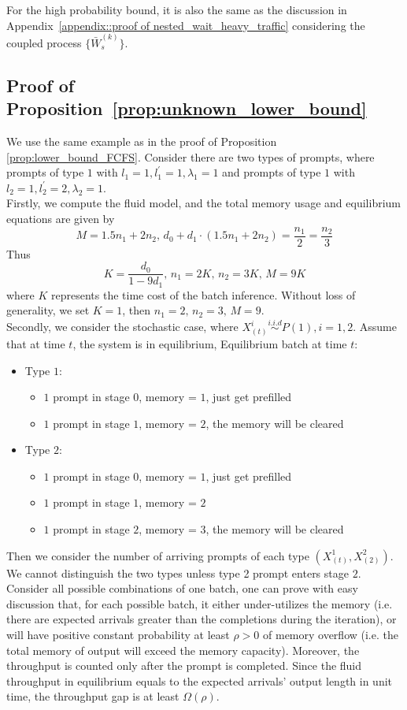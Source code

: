 For the high probability bound, it is also the same as the discussion in Appendix~\ref{appendix::proof of nested_wait_heavy_traffic} considering the coupled process $\{ \bar{W}^{(k)}_s \}$. 


\subsection{Proof of Proposition~\ref{prop:unknown_lower_bound}}\label{sec:proof_unknown_lower_bound}
We use the same example as in the proof of Proposition \ref{prop:lower_bound_FCFS}. Consider there are two types of prompts, where prompts of type $1$ with $l_1=1, l_1^\prime=1, \lambda_1=1$ and prompts of type $1$ with $l_2=1, l_2^\prime=2, \lambda_2=1$. \\
Firstly, we compute the fluid model, and the total memory usage and equilibrium equations are given by
$$M = 1.5n_1+2n_2,\, d_0+d_1\cdot (1.5n_1+2n_2) = \frac{n_1}{2}=\frac{n_2}{3}$$
Thus
$$K = \frac{d_0}{1-9d_1},\, n_1 = 2K,\, n_2=3K,\, M=9K$$
where $K$ represents the time cost of the batch inference. Without loss of generality, we set $K=1$, then $n_1=2, \,n_2=3,\,M=9 $. \\
Secondly, we consider the stochastic case, where $X^i_{(t)}\overset{i.i.d}{\sim} P(1), i=1,2$. Assume that at time $t$, the system is in equilibrium, Equilibrium batch at time $t$:
\begin{itemize}
    \item Type $1$:
    \begin{itemize}
        \itemsep0em
        \item $1$ prompt in stage $0$, memory = $1$, just get prefilled
        \item $1$ prompt in stage $1$, memory = $2$, the memory will be cleared
    \end{itemize}
    \item Type $2$:
    \begin{itemize}
        \itemsep0em
        \item $1$ prompt in stage $0$, memory = $1$, just get prefilled
        \item $1$ prompt in stage $1$, memory = $2$
        \item $1$ prompt in stage $2$, memory = $3$, the memory will be cleared
    \end{itemize}
\end{itemize}
Then we consider the number of arriving prompts of each type $(X^1_{(t)}, X^2_{(2)})$. We cannot distinguish the two types unless type 2 prompt enters stage $2$. Consider all possible combinations of one batch, one can prove with easy discussion that, for each possible batch, it either under-utilizes the memory (i.e. there are expected arrivals greater than the completions during the iteration), or will have positive constant probability at least $\rho>0$ of memory overflow (i.e. the total memory of output will exceed the memory capacity). Moreover, the throughput is counted only after the prompt is completed. Since the fluid throughput in equilibrium equals to the expected arrivals' output length in unit time, the throughput gap is at least $\Omega(\rho).$





